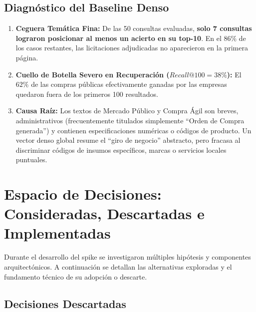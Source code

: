 \documentclass[11pt,a4paper]{article}
\begin{document}
\subsection{Diagnóstico del Baseline Denso}
\begin{enumerate}[leftmargin=*]
    \item \textbf{Ceguera Temática Fina:} De las 50 consultas evaluadas, \textbf{solo 7 consultas lograron posicionar al menos un acierto en su top-10}. En el $86\%$ de los casos restantes, las licitaciones adjudicadas no aparecieron en la primera página.
    \item \textbf{Cuello de Botella Severo en Recuperación ($Recall@100 = 38\%$):} El $62\%$ de las compras públicas efectivamente ganadas por las empresas quedaron fuera de los primeros 100 resultados.
    \item \textbf{Causa Raíz:} Los textos de Mercado Público y Compra Ágil son breves, administrativos (frecuentemente titulados simplemente ``Orden de Compra generada'') y contienen especificaciones numéricas o códigos de producto. Un vector denso global resume el ``giro de negocio'' abstracto, pero fracasa al discriminar códigos de insumos específicos, marcas o servicios locales puntuales.
\end{enumerate}

\section{Espacio de Decisiones: Consideradas, Descartadas e Implementadas}

Durante el desarrollo del spike se investigaron múltiples hipótesis y componentes arquitectónicos. A continuación se detallan las alternativas exploradas y el fundamento técnico de su adopción o descarte.

\subsection{Decisiones Descartadas}
\end{document}
